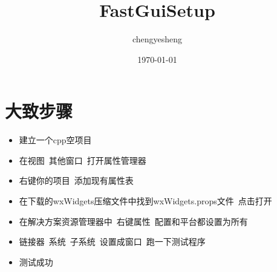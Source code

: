 \documentclass[11pt,a4paper]{article}
\title{FastGuiSetup}
\author{chengyesheng}
\date{\today}
\begin{document}
	\maketitle
	\section{大致步骤}
	\begin{itemize}
		\item 建立一个cpp空项目
		\item 在视图\ 其他窗口\ 打开属性管理器
		\item 右键你的项目\ 添加现有属性表
		\item 在下载的wxWidgets压缩文件中找到wxWidgets.props文件\ 点击打开
		\item 在解决方案资源管理器中\ 右键属性\ 配置和平台都设置为所有
		
		\item 链接器\ 系统\ 子系统\ 设置成窗口\ 跑一下测试程序
		
		\item 测试成功
	\end{itemize}
\end{document}
